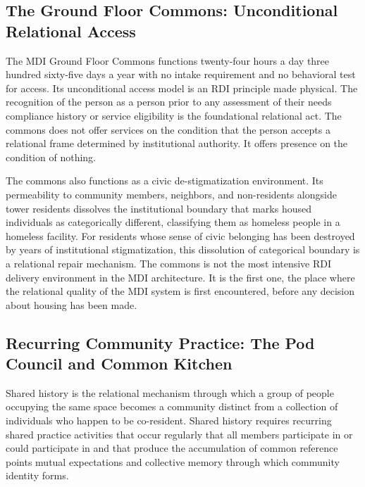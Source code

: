 \documentclass[12pt, letterpaper]{article}
\begin{document}
\subsection{The Ground Floor Commons: Unconditional Relational Access}

The MDI Ground Floor Commons functions twenty-four hours a day three hundred sixty-five days a year with no intake requirement and no behavioral test for access. Its unconditional access model is an RDI principle made physical. The recognition of the person as a person prior to any assessment of their needs compliance history or service eligibility is the foundational relational act. The commons does not offer services on the condition that the person accepts a relational frame determined by institutional authority. It offers presence on the condition of nothing.

The commons also functions as a civic de-stigmatization environment. Its permeability to community members, neighbors, and non-residents alongside tower residents dissolves the institutional boundary that marks housed individuals as categorically different, classifying them as homeless people in a homeless facility. For residents whose sense of civic belonging has been destroyed by years of institutional stigmatization, this dissolution of categorical boundary is a relational repair mechanism. The commons is not the most intensive RDI delivery environment in the MDI architecture. It is the first one, the place where the relational quality of the MDI system is first encountered, before any decision about housing has been made.

\subsection{Recurring Community Practice: The Pod Council and Common Kitchen}

Shared history is the relational mechanism through which a group of people occupying the same space becomes a community distinct from a collection of individuals who happen to be co-resident. Shared history requires recurring shared practice activities that occur regularly that all members participate in or could participate in and that produce the accumulation of common reference points mutual expectations and collective memory through which community identity forms.
\end{document}
